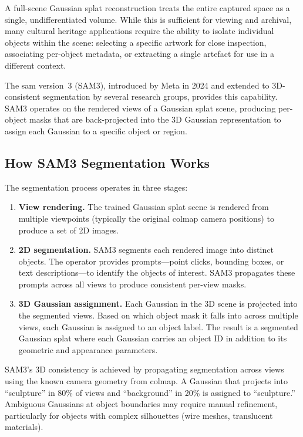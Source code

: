 A full-scene Gaussian splat reconstruction treats the entire captured space as a single, undifferentiated volume. While this is sufficient for viewing and archival, many cultural heritage applications require the ability to isolate individual objects within the scene: selecting a specific artwork for close inspection, associating per-object metadata, or extracting a single artefact for use in a different context.

The \acrlong{sam} version~3 (SAM3), introduced by Meta in 2024 and extended to 3D-consistent segmentation by several research groups, provides this capability. SAM3 operates on the rendered views of a Gaussian splat scene, producing per-object masks that are back-projected into the 3D Gaussian representation to assign each Gaussian to a specific object or region.

\subsection{How SAM3 Segmentation Works}

The segmentation process operates in three stages:

\begin{enumerate}
  \item \textbf{View rendering.} The trained Gaussian splat scene is rendered from multiple viewpoints (typically the original \acrshort{colmap} camera positions) to produce a set of 2D images.

  \item \textbf{2D segmentation.} SAM3 segments each rendered image into distinct objects. The operator provides prompts---point clicks, bounding boxes, or text descriptions---to identify the objects of interest. SAM3 propagates these prompts across all views to produce consistent per-view masks.

  \item \textbf{3D Gaussian assignment.} Each Gaussian in the 3D scene is projected into the segmented views. Based on which object mask it falls into across multiple views, each Gaussian is assigned to an object label. The result is a segmented Gaussian splat where each Gaussian carries an object ID in addition to its geometric and appearance parameters.
\end{enumerate}

\begin{technote}
SAM3's 3D consistency is achieved by propagating segmentation across views using the known camera geometry from \acrshort{colmap}. A Gaussian that projects into ``sculpture'' in 80\% of views and ``background'' in 20\% is assigned to ``sculpture.'' Ambiguous Gaussians at object boundaries may require manual refinement, particularly for objects with complex silhouettes (wire meshes, translucent materials).
\end{technote}

